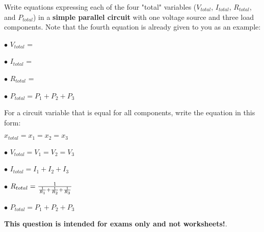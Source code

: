 

Write equations expressing each of the four "total" variables ($V_{total}$, $I_{total}$, $R_{total}$, and $P_{total}$) in a {\bf simple parallel circuit} with one voltage source and three load components.  Note that the fourth equation is already given to you as an example:

\vskip 10pt

\medskip
\item{$\bullet$} $V_{total}$ =
\vskip 5pt
\item{$\bullet$} $I_{total}$ =
\vskip 5pt
\item{$\bullet$} $R_{total}$ =
\vskip 5pt
\item{$\bullet$} $P_{total} = P_1 + P_2 + P_3$
\medskip

\vskip 10pt

For a circuit variable that is equal for all components, write the equation in this form: 

$x_{total} = x_1 = x_2 = x_3$







\medskip
\item{$\bullet$} $V_{total} = V_1 = V_2 = V_3$
\vskip 5pt
\item{$\bullet$} $I_{total} = I_1 + I_2 + I_3$
\vskip 5pt
\item{$\bullet$} $R_{total} = {1 \over {{1 \over R_1} + {1 \over R_2} + {1 \over R_3}}}$
\vskip 5pt
\item{$\bullet$} $P_{total} = P_1 + P_2 + P_3$
\medskip







{\bf This question is intended for exams only and not worksheets!}.



